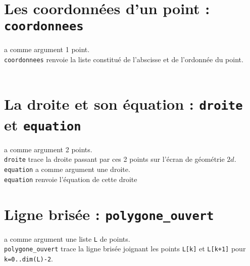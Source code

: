 \documentclass[12pt,a4paper]{book}
\begin{document}
\begin{giacjshere}
\section{Les coordonn\'ees d'un point : {\tt coordonnees}}
 a comme argument 1 point.\\
{\tt coordonnees} renvoie la liste constitu\'e de l'abscisse et de l'ordonn\'ee
 du point.\\
\\
\section{La droite et son \'equation : {\tt droite} et {\tt equation}}
 a comme argument 2 points.\\
{\tt droite} trace la droite passant par ces 2 points sur l'\'ecran de 
g\'eom\'etrie $2d$.\\
{\tt equation} a comme argument une droite.\\
{\tt equation} renvoie l'\'equation de cette droite\\
\section{Ligne bris\'ee : {\tt polygone\_ouvert}}
 a comme argument une liste {\tt L} de points.\\
{\tt polygone\_ouvert} trace la ligne bris\'ee joignant les points 
{\tt L[k]} et {\tt L[k+1]} pour {\tt k=0..dim(L)-2}.\\

\end{giacjshere}
\end{document}
